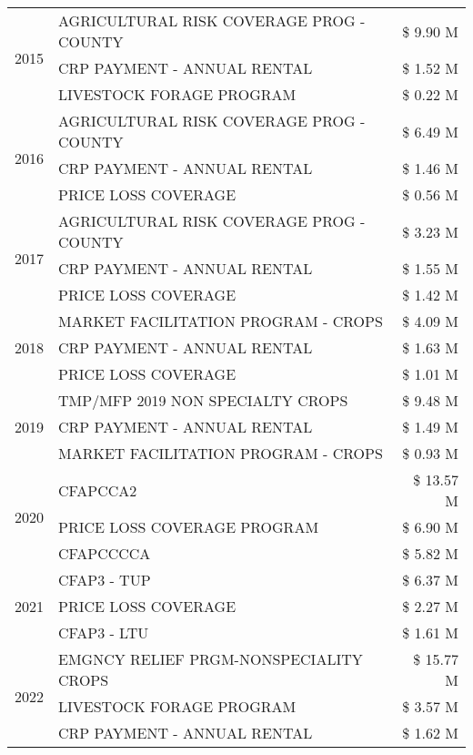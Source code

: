 \begin{tabular}{llr}
\cline{1-3}
\multirow[t]{3}{*}{2015} & AGRICULTURAL RISK COVERAGE PROG - COUNTY & \$ 9.90 M \\
 & CRP PAYMENT - ANNUAL RENTAL & \$ 1.52 M \\
 & LIVESTOCK FORAGE PROGRAM & \$ 0.22 M \\
\cline{1-3}
\multirow[t]{3}{*}{2016} & AGRICULTURAL RISK COVERAGE PROG - COUNTY & \$ 6.49 M \\
 & CRP PAYMENT - ANNUAL RENTAL & \$ 1.46 M \\
 & PRICE LOSS COVERAGE & \$ 0.56 M \\
\cline{1-3}
\multirow[t]{3}{*}{2017} & AGRICULTURAL RISK COVERAGE PROG - COUNTY & \$ 3.23 M \\
 & CRP PAYMENT - ANNUAL RENTAL & \$ 1.55 M \\
 & PRICE LOSS COVERAGE & \$ 1.42 M \\
\cline{1-3}
\multirow[t]{3}{*}{2018} & MARKET FACILITATION PROGRAM - CROPS & \$ 4.09 M \\
 & CRP PAYMENT - ANNUAL RENTAL & \$ 1.63 M \\
 & PRICE LOSS COVERAGE & \$ 1.01 M \\
\cline{1-3}
\multirow[t]{3}{*}{2019} & TMP/MFP 2019 NON SPECIALTY CROPS & \$ 9.48 M \\
 & CRP PAYMENT - ANNUAL RENTAL & \$ 1.49 M \\
 & MARKET FACILITATION PROGRAM - CROPS & \$ 0.93 M \\
\cline{1-3}
\multirow[t]{3}{*}{2020} & CFAPCCA2 & \$ 13.57 M \\
 & PRICE LOSS COVERAGE PROGRAM & \$ 6.90 M \\
 & CFAPCCCCA & \$ 5.82 M \\
\cline{1-3}
\multirow[t]{3}{*}{2021} & CFAP3 - TUP & \$ 6.37 M \\
 & PRICE LOSS COVERAGE & \$ 2.27 M \\
 & CFAP3 - LTU & \$ 1.61 M \\
\cline{1-3}
\multirow[t]{3}{*}{2022} & EMGNCY RELIEF PRGM-NONSPECIALITY CROPS & \$ 15.77 M \\
 & LIVESTOCK FORAGE PROGRAM & \$ 3.57 M \\
 & CRP PAYMENT - ANNUAL RENTAL & \$ 1.62 M \\
\cline{1-3}
\bottomrule
\end{tabular}
